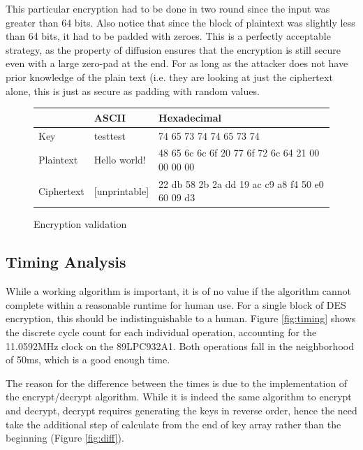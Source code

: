 \documentclass[conference]{IEEEtran}
\begin{document}
This particular encryption had to be done in two round since the input was greater than 64 bits. Also notice that since the block of plaintext was slightly less than 64 bits, it had to be padded with zeroes. This is a perfectly acceptable strategy, as the property of diffusion ensures that the encryption is still secure even with a large zero-pad at the end. For as long as the attacker does not have prior knowledge of the plain text (i.e. they are looking at just the ciphertext alone, this is just as secure as padding with random values.

\begin{figure}[ht]
  \centering
\begin{tabular}{ | l || l | p{1.4in} | }
  \hline
  & ASCII & Hexadecimal\\
  \hline\hline
  Key & testtest & 74 65 73 74 74 65 73 74 \\
  Plaintext & Hello world! & 48 65 6c 6c 6f 20 77 6f 72 6c 64 21 00 00 00 00 \\
  Ciphertext & [unprintable] & 22 db 58 2b 2a dd 19 ac c9 a8 f4 50 e0 60 09 d3 \\
  \hline
\end{tabular}
  \caption{Encryption validation}
  \label{fig:example}
\end{figure}

\subsection{Timing Analysis}

While a working algorithm is important, it is of no value if the algorithm cannot complete within a reasonable runtime for human use. For a single block of DES encryption, this should be indistinguishable to a human. Figure \ref{fig:timing} shows the discrete cycle count for each individual operation, accounting for the 11.0592MHz clock on the 89LPC932A1. Both operations fall in the neighborhood of 50ms, which is a good enough time.

The reason for the difference between the times is due to the implementation of the encrypt/decrypt algorithm. While it is indeed the same algorithm to encrypt and decrypt, decrypt requires generating the keys in reverse order, hence the need take the additional step of calculate from the end of key array rather than the beginning (Figure \ref{fig:diff}). 
\end{document}
